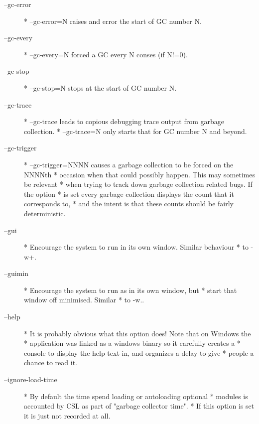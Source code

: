\documentclass[a4paper,11pt]{article}
\begin{document}
\begin{description}
\item [{\ttfamily --gc-error}] 
          * --gc-error=N raises and error the start of GC number N.

\item [{\ttfamily --gc-every}] 
          * --gc-every=N forced a GC every N conses (if N!=0).

\item [{\ttfamily --gc-stop}] 
          * --gc-stop=N stops at the start of GC number N.

\item [{\ttfamily --gc-trace}] 
          * --gc-trace leads to copious debugging trace output from garbage collection.
          * --gc-trace=N only starts that for GC number N and beyond.

\item [{\ttfamily --gc-trigger}] 
          * --gc-trigger=NNNN causes a garbage collection to be forced on the NNNNth
          * occasion when that could possibly happen. This may sometimes be relevant
          * when trying to track down garbage collection related bugs. If the option
          * is set every garbage collection displays the count that it corresponds to,
          * and the intent is that these counts should be fairly deterministic.

\item [{\ttfamily --gui}] 
          * Encourage the system to run in its own window. Similar behaviour
          * to {\ttfamily -w+}.

\item [{\ttfamily --guimin}] 
          * Encourage the system to run as in its own window, but
          * start that window off minimised. Similar
          * to {\ttfamily -w.}.

\item [{\ttfamily --help}] 
          * It is probably obvious what this option does! Note that on Windows the
          * application was linked as a windows binary so it carefully creates a
          * console to display the help text in, and organizes a delay to give
          * people a chance to read it.

\item [{\ttfamily --ignore-load-time}] 
          * By default the time spend loading or autoloading optional
          * modules is accounted by CSL as part of "garbage collector time".
          * If this option is set it is just not recorded at all.


\end{description}
\end{document}

